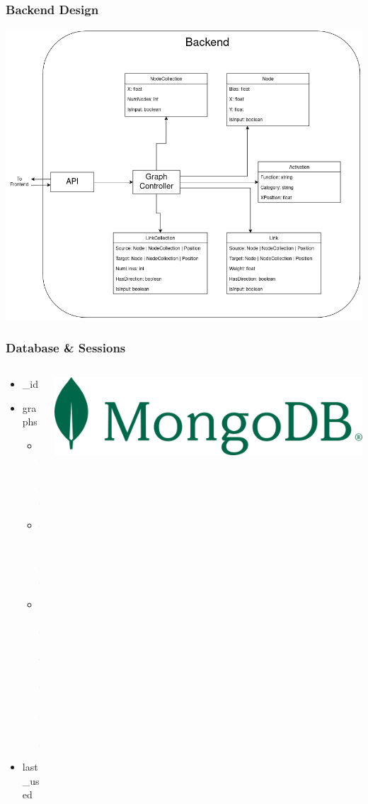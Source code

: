\documentclass{beamer}
\begin{document}
\begin{frame}
    \frametitle{Backend Design} 
    \centering
    \includegraphics[scale=0.25]{../../docs/diagrams/class_diagram_backend.png}
\end{frame}

\begin{frame}
    \frametitle{Database \& Sessions}
    \begin{columns}
        \begin{column}{0.5\textwidth}
            \begin{itemize}
                \item \_id
                \item graphs
                \begin{itemize}
                    \item nodes
                    \item edges
                    \item activations
                \end{itemize}
                \item last\_used
            \end{itemize}
        \end{column}
        \begin{column}{0.5\textwidth}
            \includegraphics[scale=0.125]{res/MongoDB_ForestGreen.png}
        \end{column}
    \end{columns}
\end{frame}
\end{document}
